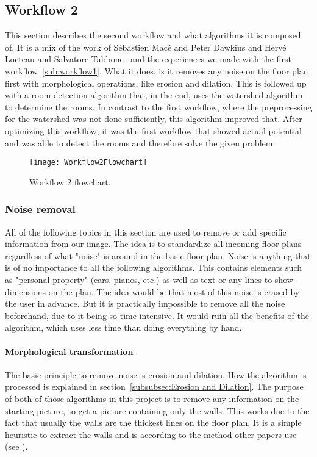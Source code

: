 \subsection{Workflow 2}
\label{sub:workflow2}
This section describes the second workflow and what algorithms it is composed of. It is a mix of the work of Sébastien Macé and Peter Dawkins and Hervé Locteau and Salvatore Tabbone~\citep{mace_valveny_loctea_tabbone_2010} and the experiences we made with the first workflow~\ref{sub:workflow1}. What it does, is it removes any noise on the floor plan first with morphological operations, like erosion and dilation. This is followed up with a room detection algorithm that, in the end, uses the watershed algorithm to determine the rooms. In contrast to the first workflow, where the preprocessing for the watershed was not done sufficiently, this algorithm improved that. After optimizing this workflow, it was the first workflow that showed actual potential and was able to detect the rooms and therefore solve the given problem.


\begin{figure}[H]
	\centering
	\texttt{[image: Workflow2Flowchart]}
	\caption{Workflow 2 flowchart.}
	\label{fig:Workflow2Flowchart}
\end{figure}

\subsubsection{Noise removal}
All of the following topics in this section are used to remove or add specific information from our image. The idea is to standardize all incoming floor plans regardless of what "noise" is around in the basic floor plan. Noise is anything that is of no importance to all the following algorithms. This contains elements such as "personal-property" (cars, pianos, etc.) as well as text or any lines to show dimensions on the plan. The idea would be that most of this noise is erased by the user in advance. But it is practically impossible to remove all the noise beforehand, due to it being so time intensive. It would ruin all the benefits of the algorithm, which uses less time than doing everything by hand.

\paragraph{Morphological transformation}
\label{sub:MorphologicalTransformation}

The basic principle to remove noise is erosion and dilation. How the algorithm is processed is explained in section~\ref{subsubsec:Erosion and Dilation}.
The purpose of both of those algorithms in this project is to remove any information on the starting picture, to get a picture containing only the walls. This works due to the fact that usually the walls are the thickest lines on the floor plan. It is a simple heuristic to extract the walls and is according to the method other papers use (see \citep{ahmed_liwicki_weber_dengel_2012}).

